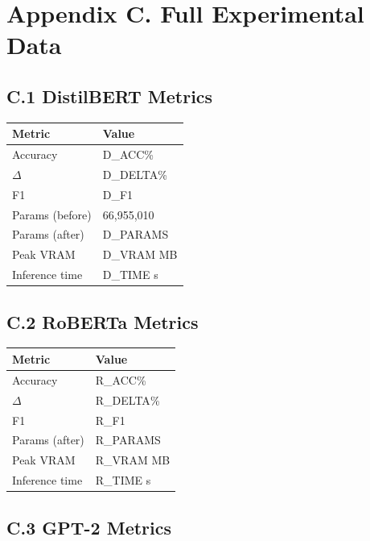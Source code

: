 
\section{Appendix C. Full Experimental Data}

\subsection{C.1 DistilBERT Metrics}

\begin{table}[H]
\centering
\small
\begin{tabular}{ll}
\toprule
\textbf{Metric} & \textbf{Value} \\
\midrule
Accuracy & {{D\_ACC}}\% \\
$\Delta$ & {{D\_DELTA}}\% \\
F1 & {{D\_F1}} \\
Params (before) & 66,955,010 \\
Params (after) & {{D\_PARAMS}} \\
Peak VRAM & {{D\_VRAM}} MB \\
Inference time & {{D\_TIME}} s \\
\bottomrule
\end{tabular}
\end{table}

\subsection{C.2 RoBERTa Metrics}

\begin{table}[H]
\centering
\small
\begin{tabular}{ll}
\toprule
\textbf{Metric} & \textbf{Value} \\
\midrule
Accuracy & {{R\_ACC}}\% \\
$\Delta$ & {{R\_DELTA}}\% \\
F1 & {{R\_F1}} \\
Params (after) & {{R\_PARAMS}} \\
Peak VRAM & {{R\_VRAM}} MB \\
Inference time & {{R\_TIME}} s \\
\bottomrule
\end{tabular}
\end{table}

\subsection{C.3 GPT-2 Metrics}

